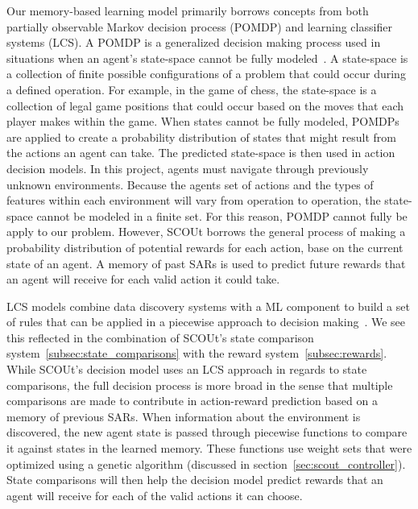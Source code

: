Our memory-based learning model primarily borrows concepts from both partially observable Markov decision process (POMDP) and learning classifier systems (LCS).
A POMDP is a generalized decision making process used in situations when an agent's state-space cannot be fully modeled~\cite{r_cassandra_survey_1998, shani_survey_2013}.
A state-space is a collection of finite possible configurations of a problem that could occur during a defined operation.
For example, in the game of chess, the state-space is a collection of legal game positions that could occur based on the moves that each player makes within the game.
When states cannot be fully modeled, POMDPs are applied to create a probability distribution of states that might result from the actions an agent can take.
The predicted state-space is then used in action decision models.
In this project, agents must navigate through previously unknown environments.
Because the agents set of actions and the types of features within each environment will vary from operation to operation, the state-space cannot be modeled in a finite set.
For this reason, POMDP cannot fully be apply to our problem.
However, SCOUt borrows the general process of making a probability distribution of potential rewards for each action, base on the current state of an agent.
A memory of past SARs is used to predict future rewards that an agent will receive for each valid action it could take.

LCS models combine data discovery systems with a ML component to build a set of rules that can be applied in a piecewise approach to decision making~\cite{sigaud_learning_2007}.
We see this reflected in the combination of SCOUt's state comparison system~\ref{subsec:state_comparisons} with the reward system~\ref{subsec:rewards}.
While SCOUt's decision model uses an LCS approach in regards to state comparisons, the full decision process is more broad in the sense that multiple comparisons are made to contribute in action-reward prediction based on a memory of previous SARs.
When information about the environment is discovered, the new agent state is passed through piecewise functions to compare it against states in the learned memory.
These functions use weight sets that were optimized using a genetic algorithm (discussed in section~\ref{sec:scout_controller}).
State comparisons will then help the decision model predict rewards that an agent will receive for each of the valid actions it can choose.





